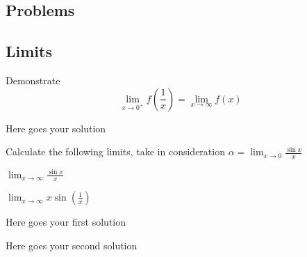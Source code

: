 \begin{center} \section{Problems} \end{center}

\subsection{Limits}

\begin{problem}
    Demonstrate $$\lim_{x \rightarrow 0^+}f\left(\frac{1}{x}\right) = \lim_{x \rightarrow \infty}f(x)$$
\end{problem}

\begin{answer}
    Here goes your solution
\end{answer}

\begin{problem}
    Calculate the following limits, take in consideration $\alpha = \lim_{x \rightarrow 0} \frac{\sin x}{x}$
    
    \begin{subproblem}
        $\lim_{x \rightarrow \infty} \frac{\sin x}{x}$
    \end{subproblem}
    
    \begin{subproblem}
        $\lim_{x \rightarrow \infty} x \sin(\frac{1}{x})$
    \end{subproblem}
    
\end{problem}

\begin{answer}
    
    \begin{subanswer}
        Here goes your first solution
    \end{subanswer}
    
    \begin{subanswer}
        Here goes your second solution
    \end{subanswer}
     
\end{answer}
